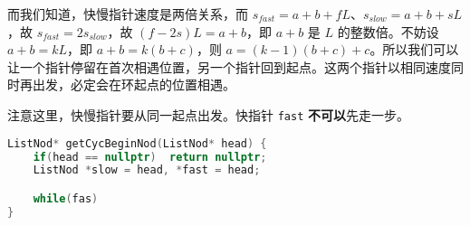 而我们知道，快慢指针速度是两倍关系，而 $s_{fast} = a + b + fL$、$s_{slow} = a+ b + sL$，故 $s_{fast} = 2 s_{slow}$，故 $(f-2s)L = a+b$，即 $a+b$ 是 $L$ 的整数倍。不妨设 $a+b = k L$，即 $a+b=k (b+c)$，则 $a = (k-1)(b+c)+c$。所以我们可以让一个指针停留在首次相遇位置，另一个指针回到起点。这两个指针以相同速度同时再出发，必定会在环起点的位置相遇。

注意这里，快慢指针要从同一起点出发。快指针 \verb`fast` \textbf{不可以}先走一步。
\begin{lstlisting}[language=cpp]
ListNod* getCycBeginNod(ListNod* head) {
    if(head == nullptr)  return nullptr;
    ListNod *slow = head, *fast = head;

    while(fas)
}
\end{lstlisting}